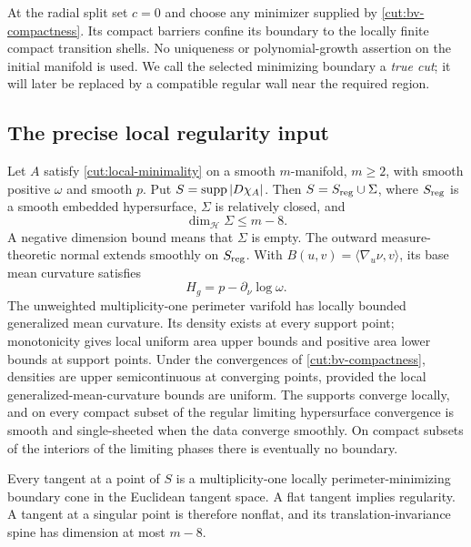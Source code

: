At the radial split set $c=0$ and choose any minimizer supplied by
\cref{cut:bv-compactness}.  Its compact barriers confine its boundary to
the locally finite compact transition shells.  No uniqueness or
polynomial-growth assertion on the initial manifold is used.  We call
the selected minimizing boundary a \emph{true cut}; it will later be
replaced by a compatible regular wall near the required region.

\subsection{The precise local regularity input}

\begin{theorem}\label{cut:gmt}
Let $A$ satisfy \eqref{cut:local-minimality} on a smooth $m$-manifold,
$m\ge2$, with smooth positive $\omega$ and smooth $p$.  Put
$S=\operatorname{supp}|D\chi_A|$.  Then $S=S_{\rm reg}\cup\Sigma$, where $S_{\rm reg}$
is a smooth embedded hypersurface, $\Sigma$ is relatively closed, and
\begin{equation}\label{cut:singular-dimension}
                         \dim_{\mathcal H}\Sigma\le m-8.
\end{equation}
A negative dimension bound means that $\Sigma$ is empty.  The outward
measure-theoretic normal extends smoothly on $S_{\rm reg}$.  With
$B(u,v)=\langle\nabla_u\nu,v\rangle$, its base mean curvature satisfies
\begin{equation}\label{cut:base-mean-curvature}
                    H_g=p-\partial_\nu\log\omega.
\end{equation}
The unweighted multiplicity-one perimeter varifold has locally bounded
generalized mean curvature.  Its density exists at every support point;
monotonicity gives local uniform area upper bounds and positive area
lower bounds at support points.  Under the convergences of
\cref{cut:bv-compactness}, densities are upper semicontinuous at
converging points, provided the local generalized-mean-curvature bounds
are uniform.  The supports converge locally, and on every compact
subset of the regular limiting hypersurface convergence is smooth and
single-sheeted when the data converge smoothly.  On compact subsets of
the interiors of the limiting phases there is eventually no boundary.

Every tangent at a point of $S$ is a multiplicity-one locally
perimeter-minimizing boundary cone in the Euclidean tangent space.
A flat tangent implies regularity.  A tangent at a singular point is
therefore nonflat, and its translation-invariance spine has dimension
at most $m-8$.
\end{theorem}

